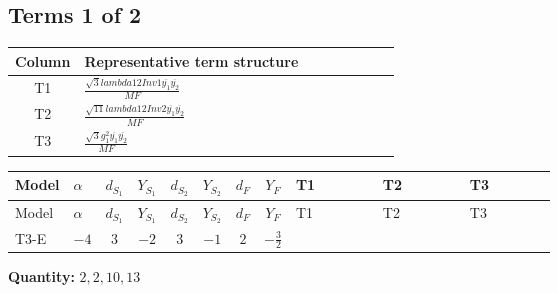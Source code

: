 \documentclass[8pt]{article}
\begin{document}
\begin{landscape}
\subsection*{Terms 1 of 2}
\begin{center}
\begin{tabular}{@{}c >{\raggedright\arraybackslash}p{0.82\linewidth}@{}}
\toprule
Column & Representative term structure \\
\midrule
T1 & \(\displaystyle \frac{\sqrt{3} lambda12Inv1 \overline{y_{1}} \overline{y_{2}}}{MF}\) \\
\midrule
T2 & \(\displaystyle \frac{\sqrt{11} lambda12Inv2 \overline{y_{1}} \overline{y_{2}}}{MF}\) \\
\midrule
T3 & \(\displaystyle \frac{\sqrt{3} g_{1}^{2} \overline{y_{1}} \overline{y_{2}}}{MF}\) \\
\midrule
\bottomrule
\end{tabular}
\end{center}
\smallskip
\tiny
\begin{longtable}{@{}llcccccc >{\raggedright\arraybackslash}p{0.21\linewidth} >{\raggedright\arraybackslash}p{0.21\linewidth} >{\raggedright\arraybackslash}p{0.21\linewidth}@{}}
\toprule
Model & $\alpha$ & $d_{S_1}$ & $Y_{S_1}$ & $d_{S_2}$ & $Y_{S_2}$ & $d_F$ & $Y_F$ & T1 & T2 & T3 \\
\midrule
\endfirsthead
\toprule
Model & $\alpha$ & $d_{S_1}$ & $Y_{S_1}$ & $d_{S_2}$ & $Y_{S_2}$ & $d_F$ & $Y_F$ & T1 & T2 & T3 \\
\midrule
\endhead
T3-E & $-4$ & $3$ & $-2$ & $3$ & $-1$ & $2$ & $-\frac{3}{2}$ & \scriptsize\adjustbox{max width=\linewidth}{$\begin{gathered} - \frac{\sqrt{3} lambda12Inv1 \overline{y_{1}} \overline{y_{2}}}{6 MF}\end{gathered}$} & \scriptsize\adjustbox{max width=\linewidth}{$\begin{gathered} \frac{3 \sqrt{11} lambda12Inv2 \overline{y_{1}} \overline{y_{2}}}{22 MF}\end{gathered}$} & \scriptsize\adjustbox{max width=\linewidth}{$\begin{gathered} \frac{9 \sqrt{3} g_{1}^{2} \overline{y_{1}} \overline{y_{2}}}{8 MF}\end{gathered}$} \\
\midrule
\bottomrule
\end{longtable}
\clearpage
\noindent\textbf{Quantity: }$\mathrm{2,2,10,13}$\par\smallskip

\end{landscape}
\end{document}
